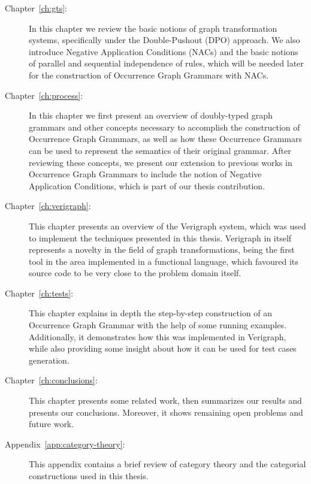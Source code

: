 \begin{description}
	\item[Chapter~\ref{ch:gts}:] In this chapter we review the basic notions of graph transformation systems, specifically under the Double-Pushout (DPO) approach. We also introduce Negative Application Conditions (NACs) and the basic notions of parallel and sequential independence of rules, which will be needed later for the construction of Occurrence Graph Grammars with NACs.

  \item[Chapter~\ref{ch:process}:] In this chapter we first present an overview of doubly-typed graph grammars and other concepts necessary to accomplish the construction of Occurrence Graph Grammars, as well as how these Occurrence Grammars can be used to represent the semantics of their original grammar. After reviewing these concepts, we present our extension to previous works in Occurrence Graph Grammars to include the notion of Negative Application Conditions, which is part of our thesis contribution.

  \item[Chapter~\ref{ch:verigraph}:] This chapter presents an overview of the Verigraph system, which was used to implement the techniques presented in this thesis. Verigraph in itself represents a novelty in the field of graph transformations, being the first tool in the area implemented in a functional language, which favoured its source code to be very close to the problem domain itself.

  \item[Chapter~\ref{ch:tests}:] This chapter explains in depth the step-by-step construction of an Occurrence Graph Grammar with the help of some running examples. Additionally, it demonstrates how this was implemented in Verigraph, while also providing some insight about how it can be used for test cases generation.

  \item[Chapter~\ref{ch:conclusions}:] This chapter presents some related work, then summarizes our results and presents our conclusions. Moreover, it shows remaining open problems and future work.

  \item[Appendix~\ref{app:category-theory}:] This appendix contains a brief review of category theory and the categorial constructions used in this thesis.

\end{description}
